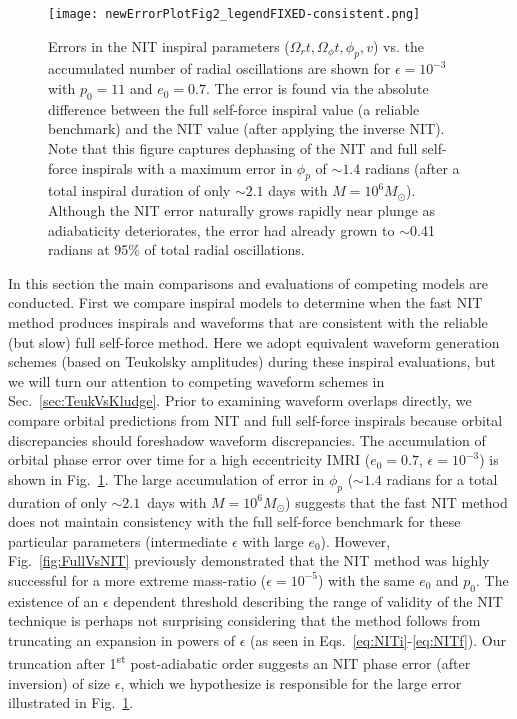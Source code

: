 \documentclass[aps,prd,twocolumn,showpacs,notitlepage,eqsecnum,
superscriptaddress,nofootinbib]{revtex4-1}
\begin{document}
\begin{figure}
  \texttt{[image: newErrorPlotFig2\_legendFIXED-consistent.png]} 
  \caption{Errors in the NIT inspiral parameters ($\Omega_r t, \Omega_{\phi}t, \phi_p, v$) vs. the accumulated number of radial oscillations are shown for $\epsilon = 10^{-3}$ with $p_0 = 11$ and $e_0 = 0.7$. The error is found via the absolute difference between the full self-force inspiral value (a reliable benchmark) and the NIT value (after applying the inverse NIT). Note that this figure captures dephasing of the NIT and full self-force inspirals with a maximum error in $\phi_p$ of $\sim 1.4$ radians (after a total inspiral duration of only $\sim 2.1$ days with $M=10^6 M_\odot$). Although the NIT error naturally grows rapidly near plunge as adiabaticity deteriorates, the error had already grown to $\sim$0.41 radians at 95\% of total radial oscillations.} 
  \label{fig3}
\end{figure}

In this section the main comparisons and evaluations of competing models are conducted. First we compare inspiral models to determine when the fast NIT method produces inspirals and waveforms that are consistent with the reliable (but slow) full self-force method. Here we adopt equivalent waveform generation schemes (based on Teukolsky amplitudes) during these inspiral evaluations, but we will turn our attention to competing waveform schemes in Sec.~\ref{sec:TeukVsKludge}. Prior to examining waveform overlaps directly, we compare orbital predictions from NIT and full self-force inspirals because orbital discrepancies should foreshadow waveform discrepancies. The accumulation of orbital phase error over time for a high eccentricity IMRI ($e_0=0.7$, $\epsilon=10^{-3}$) is shown in Fig.~\ref{fig3}. The large accumulation of error in $\phi_p$ ($\sim 1.4$ radians for a total duration of only $\sim 2.1$~days with $M=10^6 M_\odot$) suggests that the fast NIT method does not maintain consistency with the full self-force benchmark for these particular parameters (intermediate $\epsilon$ with large $e_0$). However, Fig.~\ref{fig:FullVsNIT} previously demonstrated that the NIT method was highly successful for a more extreme mass-ratio ($\epsilon = 10^{-5}$) with the same $e_0$ and $p_0$. The existence of an $\epsilon$ dependent threshold describing the range of validity of the NIT technique is perhaps not surprising considering that the method follows from truncating an expansion in powers of $\epsilon$  (as seen in Eqs.~\ref{eq:NITi}-\ref{eq:NITf}). Our truncation after 1\textsuperscript{st} post-adiabatic order suggests an NIT phase error (after inversion) of size $\epsilon$, which we hypothesize is responsible for the large error illustrated in Fig.~\ref{fig3}.
\end{document}
